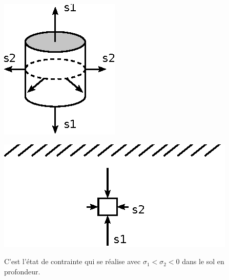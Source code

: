 \begin{multicols}{2}
    \begin{center}
        \includegraphics{../images/T1_Ch02-0007a}
    \end{center}
    \columnbreak
    \begin{center}
        \includegraphics{../images/T1_Ch02-0007b}
    \end{center}
\end{multicols}
C'est l'état de contrainte qui se réalise avec $\sigma_1 <\sigma_2 < 0$ dans le sol en profondeur. 
